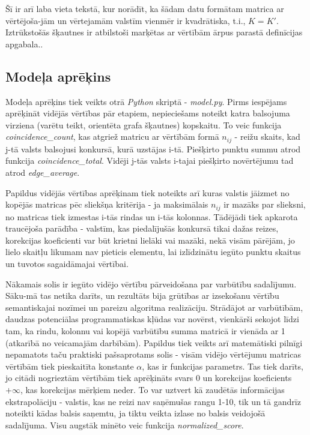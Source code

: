 \documentclass[12pt, a4paper]{article}
\begin{document}
Šī ir arī laba vieta tekstā, kur norādīt, ka šādam datu formātam matrica ar vērtējoša-jām un vērtejamām valstīm vienmēr ir kvadrātiska, t.i., $K = K'$. Iztrūkstošās šķautnes ir atbilstoši marķētas ar vērtībām ārpus parastā definīcijas apgabala..

\subsection{Modeļa aprēķins}

Modeļa aprēķins tiek veikts otrā \textit{Python} skriptā - \textit{model.py}. Pirms iespējams aprēķināt vidējās vērtības pār etapiem, nepieciešams noteikt katra balsojuma virziena (varētu teikt, orientēta grafa šķautnes) kopskaitu. To veic funkcija \textit{coincidence\_count}, kas atgriež matricu ar vērtībām formā $n_{ij}$ - reižu skaits, kad j-tā valsts balsojusi konkursā, kurā uzstājas i-tā. Piešķirto punktu summu atrod funkcija \textit{coincidence\_total}. Vidēji j-tās valsts i-tajai piešķirto novērtējumu tad atrod \textit{edge\_average}. 

Papildus vidējās vērtības aprēķinam tiek noteikts arī kuras valstis jāizmet no kopējās matricas pēc sliekšņa kritērija - ja maksimālais $n_{ij}$ ir mazāks par slieksni, no matricas tiek izmestas i-tās rindas un i-tās kolonnas. Tādējādi tiek apkarota traucējoša parādība - valstīm, kas piedalījušās konkursā tikai dažas reizes, korekcijas koeficienti var būt krietni lielāki vai mazāki, nekā visām pārējām, jo lielo skaitļu likumam nav pieticis elementu, lai izlīdzinātu iegūto punktu skaitus un tuvotos sagaidāmajai vērtībai.

Nākamais solis ir iegūto vidējo vērtību pārveidošana par varbūtību sadalījumu. Sāku-mā tas netika darīts, un rezultāts bija grūtības ar izsekošanu vērtību semantiskajai nozīmei un pareizu algoritma realizāciju. Strādājot ar varbūtībām, daudzas potenciālas programmatiskas kļūdas var novērst, vienkārši sekojot līdzi tam, ka rindu, kolonnu vai kopējā varbūtību summa matricā ir vienāda ar 1 (atkarībā no veicamajām darbībām). Papildus tiek veikts arī matemātiski pilnīgi nepamatots taču praktiski pašsaprotams solis - visām vidējo vērtējumu matricas vērtībām tiek pieskaitīta konstante $\alpha$, kas ir funkcijas parametrs. Tas tiek darīts, jo citādi nogrieztām vērtībām tiek aprēķināts svars 0 un korekcijas koeficients $+\infty$, kas korekcijas mērķiem neder. To var uztvert kā zaudētās informācijas ekstrapolāciju - valstis, kas ne reizi nav saņēmušas rangu 1-10, tik un tā gandrīz noteikti kādas balsis saņemtu, ja tiktu veikta izlase no balsis veidojošā sadalījuma. Visu augstāk minēto veic funkcija \textit{normalized\_score}.
\end{document}
